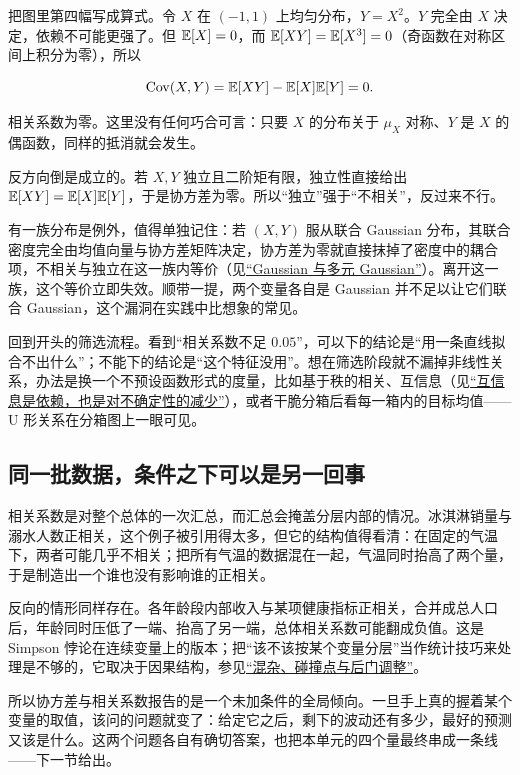 把图里第四幅写成算式。令 \(X\) 在 \((-1,1)\) 上均匀分布，\(Y=X^2\)。\(Y\) 完全由 \(X\) 决定，依赖不可能更强了。但 \(\mathbb{E}[X]=0\)，而 \(\mathbb{E}[XY]=\mathbb{E}[X^3]=0\)（奇函数在对称区间上积分为零），所以

\[
\operatorname{Cov}(X,Y)=\mathbb{E}[XY]-\mathbb{E}[X]\mathbb{E}[Y]=0.
\]

相关系数为零。这里没有任何巧合可言：只要 \(X\) 的分布关于 \(\mu_X\) 对称、\(Y\) 是 \(X\) 的偶函数，同样的抵消就会发生。

反方向倒是成立的。若 \(X,Y\) 独立且二阶矩有限，独立性直接给出 \(\mathbb{E}[XY]=\mathbb{E}[X]\mathbb{E}[Y]\)，于是协方差为零。所以``独立''强于``不相关''，反过来不行。

有一族分布是例外，值得单独记住：若 \((X,Y)\) 服从联合 Gaussian 分布，其联合密度完全由均值向量与协方差矩阵决定，协方差为零就直接抹掉了密度中的耦合项，不相关与独立在这一族内等价（见\hyperref[sec:05-Probability/06-Common-Distributions/05]{``Gaussian 与多元 Gaussian''}）。离开这一族，这个等价立即失效。顺带一提，两个变量各自是 Gaussian 并不足以让它们联合 Gaussian，这个漏洞在实践中比想象的常见。

回到开头的筛选流程。看到``相关系数不足 \(0.05\)''，可以下的结论是``用一条直线拟合不出什么''；不能下的结论是``这个特征没用''。想在筛选阶段就不漏掉非线性关系，办法是换一个不预设函数形式的度量，比如基于秩的相关、互信息（见\hyperref[sec:07-Information-Theory/02-Joint-Information/02]{``互信息是依赖，也是对不确定性的减少''}），或者干脆分箱后看每一箱内的目标均值——U 形关系在分箱图上一眼可见。

\subsection{同一批数据，条件之下可以是另一回事}

相关系数是对整个总体的一次汇总，而汇总会掩盖分层内部的情况。冰淇淋销量与溺水人数正相关，这个例子被引用得太多，但它的结构值得看清：在固定的气温下，两者可能几乎不相关；把所有气温的数据混在一起，气温同时抬高了两个量，于是制造出一个谁也没有影响谁的正相关。

反向的情形同样存在。各年龄段内部收入与某项健康指标正相关，合并成总人口后，年龄同时压低了一端、抬高了另一端，总体相关系数可能翻成负值。这是 Simpson 悖论在连续变量上的版本；把``该不该按某个变量分层''当作统计技巧来处理是不够的，它取决于因果结构，参见\hyperref[sec:13-Machine-Learning/12-Causal-Inference/03]{``混杂、碰撞点与后门调整''}。

所以协方差与相关系数报告的是一个未加条件的全局倾向。一旦手上真的握着某个变量的取值，该问的问题就变了：给定它之后，剩下的波动还有多少，最好的预测又该是什么。这两个问题各自有确切答案，也把本单元的四个量最终串成一条线——下一节给出。
